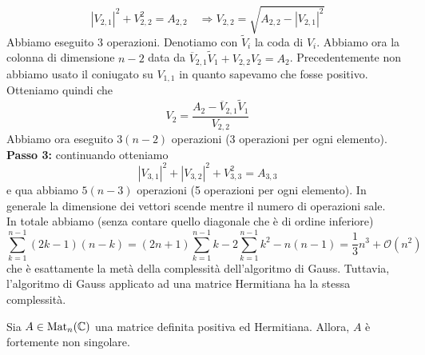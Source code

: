 \documentclass[a4paper]{article}
\begin{document}
\[
    |V_{2,1}|^2 + V_{2,2}^2 = A_{2,2} \quad\Longrightarrow V_{2,2} = \sqrt{A_{2,2} - |V_{2,1}|^2}
\]
Abbiamo eseguito \(3\) operazioni.
Denotiamo con \(\tilde V_i\) la coda di \(V_i\).
Abbiamo ora la colonna di dimensione \(n-2\) data da
\(\overline V_{2,1} \tilde V_{1} + V_{2,2} V_2 = A_2\).
Precedentemente non abbiamo usato il coniugato su \(V_{1,1}\)
in quanto sapevamo che fosse positivo. Otteniamo quindi che
\[
    V_2 = \frac{A_2 - \overline V_{2,1} \tilde V_{1}}{V_{2,2}}
\]
Abbiamo ora eseguito \(3(n-2)\) operazioni (3 operazioni per ogni elemento). \\
\textbf{Passo 3:} continuando otteniamo
\[
    |V_{3,1}|^2 + |V_{3,2}|^2 + V_{3,3}^2 = A_{3,3}
\]
e qua abbiamo \(5(n-3)\) operazioni (5 operazioni per ogni elemento).
In generale la dimensione dei vettori scende mentre il numero di operazioni sale. \\
In totale abbiamo (senza contare quello diagonale che è di ordine inferiore) \[
    \sum_{k=1}^{n-1} (2k-1)(n-k)
    = (2n+1)\sum_{k=1}^{n-1} k - 2\sum_{k=1}^{n-1} k^2 - n(n-1)
    = \frac{1}{3}n^3 + \mathcal O(n^2)
\]
che è esattamente la metà della complessità dell'algoritmo di Gauss.
Tuttavia, l'algoritmo di Gauss applicato ad una matrice Hermitiana ha la stessa complessità.

\pagebreak

\begin{snippettheorem}{}
    Sia \(A \in \operatorname{Mat}_n(\mathbb{C})\) una matrice definita positiva ed Hermitiana.
    Allora, \(A\) è fortemente non singolare.
\end{snippettheorem}
\end{document}
